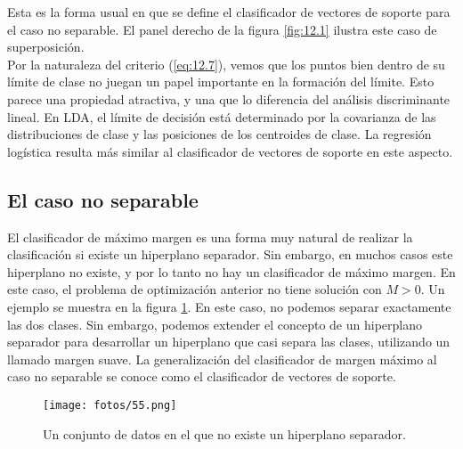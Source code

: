 Esta es la forma usual en que se define el clasificador de vectores de soporte para el caso no separable. El panel derecho de la figura \ref{fig:12.1} ilustra este caso de superposición. \\

Por la naturaleza del criterio (\ref{eq:12.7}), vemos que los puntos bien dentro de su límite de clase no juegan un papel importante en la formación del límite. Esto parece una propiedad atractiva, y una que lo diferencia del análisis discriminante lineal. En LDA, el límite de decisión está determinado por la covarianza de las distribuciones de clase y las posiciones de los centroides de clase. La regresión logística resulta más similar al clasificador de vectores de soporte en este aspecto.

\subsection{El caso no separable}

El clasificador de máximo margen es una forma muy natural de realizar la clasificación si existe un hiperplano separador. Sin embargo, en muchos casos este hiperplano no existe, y por lo tanto no hay un clasificador de máximo margen. En este caso, el problema de optimización anterior no tiene solución con $M > 0$. Un ejemplo se muestra en la figura \ref{fig:9.4}. En este caso, no podemos separar exactamente las dos clases. Sin embargo, podemos extender el concepto de un hiperplano separador para desarrollar un hiperplano que casi separa las clases, utilizando un llamado margen suave. La generalización del clasificador de margen máximo al caso no separable se conoce como el clasificador de vectores de soporte.

\begin{figure}[h]
\centering
\texttt{[image: fotos/55.png]}
\caption{Un conjunto de datos en el que no existe un hiperplano separador.}
\label{fig:9.4}
\end{figure}